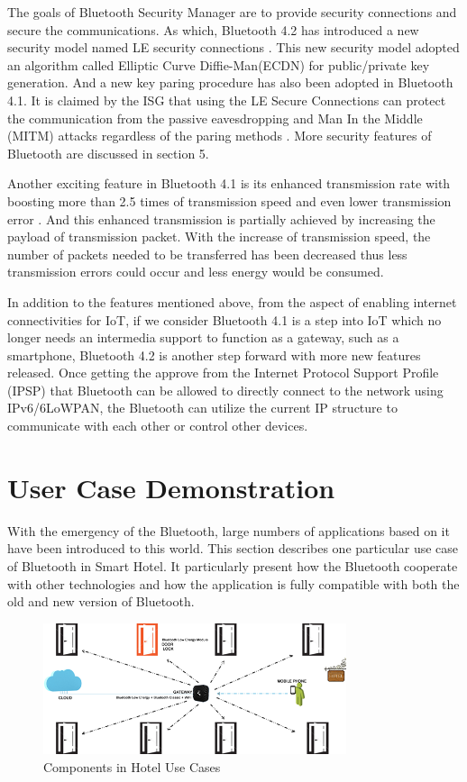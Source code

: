 \documentclass{cseminar}
\begin{document}
The goals of Bluetooth Security Manager are to provide security connections and secure the communications. As which, Bluetooth 4.2 has introduced a new security model named LE security connections \cite{BLE_SM}.  This new security model adopted an algorithm called Elliptic Curve Diffie-Man(ECDN) for public/private key generation. And a new key paring procedure has also been adopted in Bluetooth 4.1. It is claimed by the ISG that using the LE Secure Connections can protect the communication from the passive eavesdropping and Man In the Middle (MITM) attacks regardless of the paring methods \cite{BLE_SM}. More security features of Bluetooth are discussed in section 5.

Another exciting feature in Bluetooth 4.1 is its enhanced transmission rate with boosting more than 2.5 times of transmission speed and even lower transmission error \cite{BLE_4.2}. And this enhanced transmission is partially achieved by increasing the payload of transmission packet. With the increase of transmission speed, the number of packets needed to be transferred has been decreased thus less transmission errors could occur and less energy would be consumed.

In addition to the features mentioned above, from the aspect of enabling internet connectivities for IoT, if we consider Bluetooth 4.1 is a step into IoT which no longer needs an intermedia support to function as a gateway, such as a smartphone, Bluetooth 4.2 is another step forward with more new features released. Once getting the approve from the Internet Protocol Support Profile (IPSP) that Bluetooth can be allowed to directly connect to the network using IPv6/6LoWPAN, the Bluetooth can utilize the current IP structure to communicate with each other or control other devices.
\section{User Case Demonstration}
With the emergency of the Bluetooth, large numbers of applications based on it have been introduced to this world. This section describes one particular use case of Bluetooth in Smart Hotel. It particularly present how  the Bluetooth cooperate with other technologies and how the application is fully compatible with both the old and new version of Bluetooth.

\begin{figure}
\centering
\includegraphics[width=3.5in]{figures/use_case.png}
\caption{Components in Hotel Use Cases}
\label{use case}
\end{figure}
\end{document}
